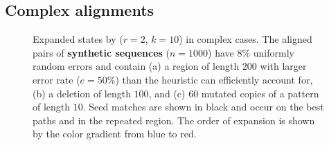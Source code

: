 \subsection{Complex alignments}\label{GLOBALsec:limitations}

\begin{figure}[H]
  \centering
  \caption[Expanded states for various complex cases]{Expanded states by \CSH
  ($r{=}2$, $k{=}10$) in complex cases. The aligned pairs of \textbf{synthetic
  sequences} ($n{=}1000$) have $8\%$ uniformly random errors and contain (a) a
  region of length $200$ with larger error rate ($e{=}50\%$) than the heuristic
  can efficiently account for, (b) a deletion of length $100$, and (c) $60$
  mutated copies of a pattern of length $10$. Seed matches are shown in black
  and occur on the best paths and in the repeated region. The order of expansion
  is shown by the color gradient from blue to red.}
  \label{GLOBALfig:limitations}
\end{figure}

